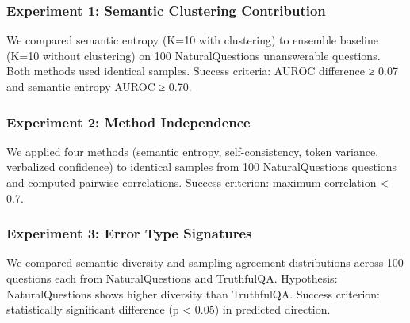 
\subsubsection{Experiment 1: Semantic Clustering Contribution}

We compared semantic entropy (K=10 with clustering) to ensemble baseline (K=10 without clustering) on 100 NaturalQuestions unanswerable questions. Both methods used identical samples. Success criteria: AUROC difference ≥ 0.07 and semantic entropy AUROC ≥ 0.70.

\subsubsection{Experiment 2: Method Independence}

We applied four methods (semantic entropy, self-consistency, token variance, verbalized confidence) to identical samples from 100 NaturalQuestions questions and computed pairwise correlations. Success criterion: maximum correlation < 0.7.

\subsubsection{Experiment 3: Error Type Signatures}

We compared semantic diversity and sampling agreement distributions across 100 questions each from NaturalQuestions and TruthfulQA. Hypothesis: NaturalQuestions shows higher diversity than TruthfulQA. Success criterion: statistically significant difference (p < 0.05) in predicted direction.
